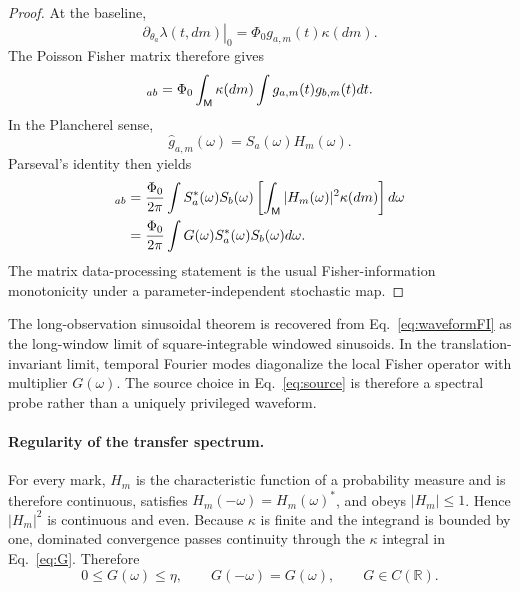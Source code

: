 \begin{proof}
At the baseline,
\begin{equation}
\left.\partial_{\theta_a}\lambda(t,dm)\right|_0
=\Phi_0 g_{a,m}(t)\kappa(dm).
\end{equation}
The Poisson Fisher matrix therefore gives
\begin{equation}
[F_{\rm out}]_{ab}
=\Phi_0\int_{\M}\kappa(dm)
\int g_{a,m}(t)g_{b,m}(t)dt.
\end{equation}
In the Plancherel sense,
\begin{equation}
\widehat g_{a,m}(\omega)=S_a(\omega)H_m(\omega).
\end{equation}
Parseval's identity then yields
\begin{align}
[F_{\rm out}]_{ab}
&=\frac{\Phi_0}{2\pi}
\int S_a^*(\omega)S_b(\omega)
\left[\int_{\M}|H_m(\omega)|^2\kappa(dm)\right]d\omega\\
&=\frac{\Phi_0}{2\pi}
\int G(\omega)S_a^*(\omega)S_b(\omega)d\omega.
\end{align}
The matrix data-processing statement is the usual Fisher-information monotonicity under a parameter-independent stochastic map.
\end{proof}

The long-observation sinusoidal theorem is recovered from Eq.~\eqref{eq:waveformFI} as the long-window limit of square-integrable windowed sinusoids. In the translation-invariant limit, temporal Fourier modes diagonalize the local Fisher operator with multiplier $G(\omega)$. The source choice in Eq.~\eqref{eq:source} is therefore a spectral probe rather than a uniquely privileged waveform.

\paragraph{Regularity of the transfer spectrum.}
For every mark, $H_m$ is the characteristic function of a probability measure and is therefore continuous, satisfies $H_m(-\omega)=H_m(\omega)^*$, and obeys $|H_m|\le1$. Hence $|H_m|^2$ is continuous and even. Because $\kappa$ is finite and the integrand is bounded by one, dominated convergence passes continuity through the $\kappa$ integral in Eq.~\eqref{eq:G}. Therefore
\begin{equation}
\boxed{
0\le G(\omega)\le\eta,
\qquad
G(-\omega)=G(\omega),
\qquad
G\in C(\mathbb R).}
\label{eq:Gregularity}
\end{equation}

